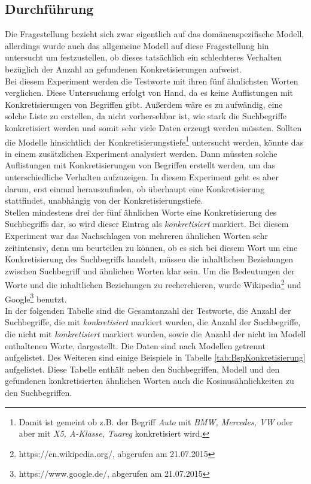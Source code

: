 \documentclass[12pt,a4paper]{report}
\begin{document}
		\subsection*{Durchführung}
		Die Fragestellung bezieht sich zwar eigentlich auf das domänenspezifische Modell, allerdings wurde auch das allgemeine Modell auf diese Fragestellung hin untersucht um festzustellen, ob dieses tatsächlich ein schlechteres Verhalten bezüglich der Anzahl an gefundenen Konkretisierungen aufweist.\\
		Bei diesem Experiment werden die Testworte mit ihren fünf ähnlichsten Worten verglichen. Diese Untersuchung erfolgt von Hand, da es keine Auflistungen mit Konkretisierungen von Begriffen gibt. Außerdem wäre es zu aufwändig, eine solche Liste zu erstellen, da nicht vorhersehbar ist, wie stark die Suchbegriffe konkretisiert werden und somit sehr viele Daten erzeugt werden müssten. Sollten die Modelle hinsichtlich der Konkretisierungstiefe\footnote{Damit ist gemeint ob z.B. der Begriff \textit{Auto} mit \textit{BMW, Mercedes, VW} oder aber mit \textit{X5, A-Klasse, Tuareg} konkretisiert wird.} untersucht werden, könnte das in einem zusätzlichen Experiment analysiert werden. Dann müssten solche Auflistungen mit Konkretisierungen von Begriffen erstellt werden, um das unterschiedliche Verhalten aufzuzeigen. In diesem Experiment geht es aber darum, erst einmal herauszufinden, ob überhaupt eine Konkretisierung stattfindet, unabhängig von der Konkretisierungstiefe.\\	
		 Stellen mindestens drei der fünf ähnlichen Worte eine Konkretisierung des Suchbegriffs dar, so wird dieser Eintrag als \textit{konkretisiert} markiert. Bei diesem Experiment war das Nachschlagen von mehreren ähnlichen Worten sehr zeitintensiv, denn um beurteilen zu können, ob es sich bei diesem Wort um eine Konkretisierung des Suchbegriffs handelt, müssen die inhaltlichen Beziehungen zwischen Suchbegriff und ähnlichen Worten klar sein. Um die Bedeutungen der Worte und die inhaltlichen Beziehungen zu recherchieren, wurde Wikipedia\footnote{https://en.wikipedia.org/, abgerufen am 21.07.2015} und Google\footnote{https://www.google.de/, abgerufen am 21.07.2015} benutzt.\\
		
		In der folgenden Tabelle sind die Gesamtanzahl der Testworte, die Anzahl der Suchbegriffe, die mit \textit{konkretisiert} markiert wurden, die Anzahl der Suchbegriffe,  die nicht mit \textit{konkretisiert} markiert wurden, sowie die Anzahl der nicht im Modell enthaltenen Worte, dargestellt. Die Daten sind nach Modellen getrennt aufgelistet. Des Weiteren sind einige Beispiele in Tabelle \ref{tab:BspKonkretisierung} aufgelistet. Diese Tabelle enthält neben den Suchbegriffen, Modell und den gefundenen konkretisierten ähnlichen Worten auch die Kosinusähnlichkeiten zu den Suchbegriffen.
		
\end{document}
